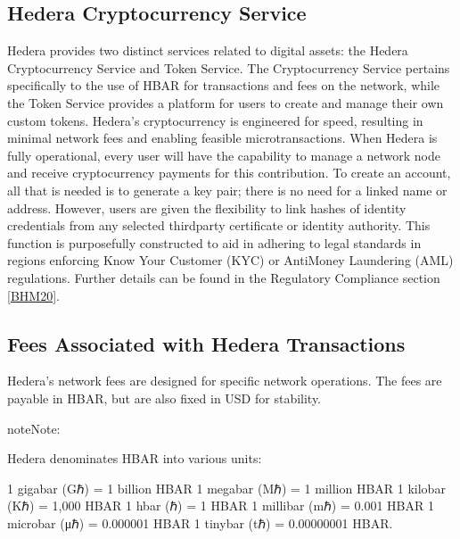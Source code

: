 \documentclass[letterpaper,10pt,english]{jupyterBook}
\begin{document}
\subsection{Hedera Cryptocurrency Service}
\label{\detokenize{HED/hed:hedera-cryptocurrency-service}}
\sphinxAtStartPar
Hedera provides two distinct services related to digital assets: the Hedera Cryptocurrency Service and Token Service. The Cryptocurrency Service pertains specifically to the use of HBAR for transactions and fees on the network, while the Token Service provides a platform for users to create and manage their own custom tokens. Hedera’s cryptocurrency is engineered for speed, resulting in minimal network fees and enabling feasible micro\sphinxhyphen{}transactions. When Hedera is fully operational, every user will have the capability to manage a network node and receive cryptocurrency payments for this contribution. To create an account, all that is needed is to generate a key pair; there is no need for a linked name or address. However, users are given the flexibility to link hashes of identity credentials from any selected third\sphinxhyphen{}party certificate or identity authority. This function is purposefully constructed to aid in adhering to legal standards in regions enforcing Know Your Customer (KYC) or Anti\sphinxhyphen{}Money Laundering (AML) regulations. Further details can be found in the Regulatory Compliance section {[}\hyperlink{cite.HED/hed:id128}{BHM20}{]}.


\subsection{Fees Associated with Hedera Transactions}
\label{\detokenize{HED/hed:fees-associated-with-hedera-transactions}}
\sphinxAtStartPar
Hedera’s network fees are designed for specific network operations. The fees are payable in HBAR, but are also fixed in USD for stability.

\begin{sphinxadmonition}{note}{Note:}
\sphinxAtStartPar
{}

\sphinxAtStartPar
Hedera denominates HBAR into various units:

\begin{sphinxVerbatim}[commandchars=\\\{\}]
1 gigabar (Gℏ) = 1 billion HBAR
1 megabar (Mℏ) = 1 million HBAR 
1 kilobar (Kℏ) = 1,000 HBAR 
1 hbar (ℏ) = 1 HBAR 
1 millibar (mℏ) = 0.001 HBAR 
1 microbar (μℏ) = 0.000001 HBAR
1 tinybar (tℏ) = 0.00000001 HBAR.
\end{sphinxVerbatim}
\end{sphinxadmonition}
\end{document}
